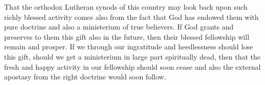 That the orthodox Lutheran synods of this country may look back upon such richly blessed activity comes also from the fact that God has endowed them with pure doctrine and also a ministerium of true believers. If God grants and preserves to them this gift also in the future, then their blessed fellowship will remain and prosper. If we through our ingratitude and heedlessness should lose this gift, should we get a ministerium in large part spiritually dead, then that the fresh and happy activity in our fellowship should soon cease and also the external apostasy from the right doctrine would soon follow.

